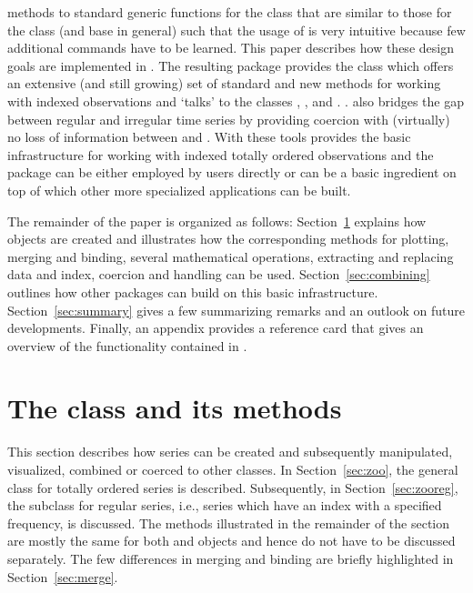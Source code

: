 \documentclass[article,nojss]{jss}
\begin{document}
methods to standard generic functions for the  class that 
are similar to those for the  class (and base  in
general) such that the usage of  is very intuitive because
few additional commands have to be learned. 
This paper describes how these design goals are implemented in .
The resulting package provides the  class which offers an
extensive (and still growing) set of standard and new methods for working
with indexed observations and `talks' to the classes , ,
 and . \citep[In addition to these independent
approaches, the class  built upon  was recently
introduced by][.]{zoo:xts:2008}.  also bridges the gap
between regular and irregular time series by providing coercion with (virtually)
no loss of information between  and .
With these tools  provides the basic infrastructure for
working with indexed totally ordered observations and the package can be either employed by
users directly or can be a basic ingredient on top of which other more specialized
applications can be built.

The remainder of the paper is organized as follows:
Section~\ref{sec:zoo-class} explains how  objects are created
and illustrates how the corresponding methods for plotting, merging and
binding, several mathematical operations, extracting and replacing data
and index, coercion and  handling can be used. Section~\ref{sec:combining}
outlines how other packages can build on this basic infrastructure.
Section~\ref{sec:summary} gives a few summarizing remarks and an outlook
on future developments. Finally, an appendix provides a reference card that
gives an overview of the functionality contained in .


\section[The class "zoo" and its methods]{The class  and its methods}
\label{sec:zoo-class}

This section describes how  series can be created and subsequently
manipulated, visualized, combined or coerced to other classes. In Section~\ref{sec:zoo},
the general class  for totally ordered series is described. Subsequently,
in Section~\ref{sec:zooreg}, the subclass  for
regular  series, i.e., series which have an index with a specified
frequency, is discussed. The methods illustrated in the remainder of the
section are mostly the same for both  and  objects
and hence do not have to be discussed separately. The few differences in merging and
binding are briefly highlighted in Section~\ref{sec:merge}.
\end{document}

